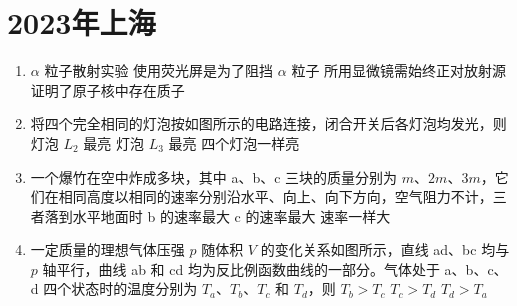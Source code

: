 \documentclass[\gkver]{gaokaozhenti}
\begin{document}
\chapter{2023年上海}

\begin{enumerate}
\item
$\alpha$ 粒子散射实验
{使用荧光屏是为了阻挡 $\alpha$ 粒子}
{所用显微镜需始终正对放射源}
{证明了原子核中存在质子}

\item
将四个完全相同的灯泡按如图所示的电路连接，闭合开关后各灯泡均发光，则
\onepicture[align=right, w=4.25cm]{}
{灯泡 $L_{2}$ 最亮}
{灯泡 $L_{3}$ 最亮}
{四个灯泡一样亮}

\item
一个爆竹在空中炸成多块，其中 a、b、c 三块的质量分别为 $m$、$2m$、$3m$，它们在相同高度以相同的速率分别沿水平、向上、向下方向，空气阻力不计，三者落到水平地面时
{b 的速率最大}
{c 的速率最大}
{速率一样大}

\item
一定质量的理想气体压强 $p$ 随体积 $V$ 的变化关系如图所示，直线 ad、bc 均与 $p$ 轴平行，曲线 ab 和 cd 均为反比例函数曲线的一部分。气体处于 a、b、c、d 四个状态时的温度分别为 $T_{a}$、$T_{b}$、$T_{c}$ 和 $T_{d}$，则
\onepicture[align=right, w=3.56cm]{}
{$T_{b} > T_{c}$}
{$T_{c} > T_{d}$}
{$T_{d} > T_{a}$}


\end{enumerate}
\end{document}
